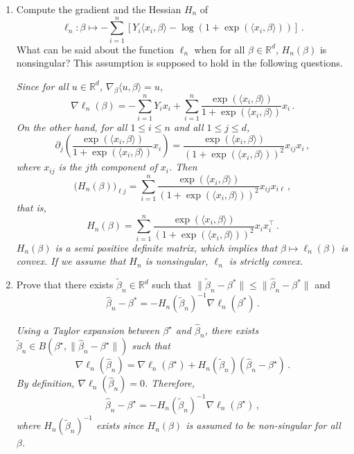 \documentclass[a4paper,10pt,fleqn]{article}
\newcommand{\eqsp}{\,}
\newcommand{\rset}{\ensuremath{\mathbb{R}}}
\newcommand{\1}{\ensuremath{\mathbbm{1}}}
\begin{document}
\begin{enumerate}
\item Compute the gradient and the Hessian $H_{n}$ of
$$
\ell_{n}:\beta \mapsto -\sum_{i=1}^n\left[Y_{i}\langle x_{i},\beta\rangle-\log(1+\exp(\langle x_{i},\beta\rangle))\right]\eqsp.
$$
What can be said about the function $\ell_{n}$ when for all $\beta\in\rset^d$, $H_{n}(\beta)$ is nonsingular? This assumption is supposed to hold in the following questions.

\vspace{.2cm}

{\em
Since for all $u\in\rset^d$, $\nabla_{\beta} \langle u, \beta \rangle = u$, 
\[
\nabla \ell_n(\beta) = - \sum_{i=1}^n Y_i x_i + \sum_{i=1}^n \frac{\exp(\langle x_{i},\beta\rangle)}{1  + \exp(\langle x_{i},\beta\rangle)} x_i\eqsp.
\]
On the other hand, for all $1\leqslant i \leqslant n$ and all $1 \leqslant j \leqslant d$,
\[
\partial_j \left( \frac{\exp(\langle x_{i},\beta\rangle)}{1  + \exp(\langle x_{i},\beta\rangle)} x_i \right) = \frac{\exp(\langle x_{i},\beta\rangle)}{(1  + \exp(\langle x_{i},\beta\rangle))^2} x_{ij}x_i\eqsp,
\]
where $x_{ij}$ is the $j$th component of $x_i$. Then
\[
\big(H_n(\beta)\big)_{\ell j} = \sum_{i=1}^n \frac{\exp(\langle x_{i},\beta\rangle)}{(1  + \exp(\langle x_{i},\beta\rangle))^2} x_{ij}x_{i \ell}\eqsp,
\]
that is,
\[
H_n(\beta) = \sum_{i=1}^n \frac{\exp(\langle x_{i},\beta\rangle)}{(1  + \exp(\langle x_{i},\beta\rangle))^2} x_{i} x_{i}^\top\eqsp.
\]
$H_n(\beta)$ is a semi positive definite matrix, which implies that $\beta \mapsto \ell_n(\beta)$ is convex. If we assume that $H_n$ is nonsingular, $\ell_n$  is strictly convex.
}
\item Prove that there exists $\widetilde \beta_n\in\rset^d$ such that $\|\widetilde \beta_n-\beta^*\|\leq \|\widehat \beta_n-\beta^*\|$ and
$$
\widehat \beta_n-\beta^*=-H_{n}(\widetilde \beta_n)^{-1}\nabla \ell_{n}(\beta^*)\eqsp.
$$

\vspace{.2cm}

{\em
Using a Taylor expansion between $\beta^{\star}$ and $\widehat{\beta}_n$, there exists $\tilde{\beta}_n \in B(\beta^{\star}, \|\widehat{\beta}_n - \beta^{\star}\|)$ such that 
\[
\nabla \ell_n(\widehat{\beta}_n) = \nabla \ell_n(\beta^{\star}) + H_n(\tilde{\beta}_n) ( \hat{\beta}_n - \beta^{\star})\eqsp. 
\]
By definition, $\nabla\ell_n(\widehat{\beta}_n) = 0$. Therefore, 
\[
\widehat{\beta}_n - \beta^{\star} = - H_n(\tilde{\beta}_n)^{-1} \nabla \ell_n(\beta^{\star})\eqsp,
\]
where $H_n(\tilde{\beta}_n)^{-1}$ exists since $H_n(\beta)$ is assumed to be non-singular for all $\beta$.
}
\end{enumerate}
\end{document}
